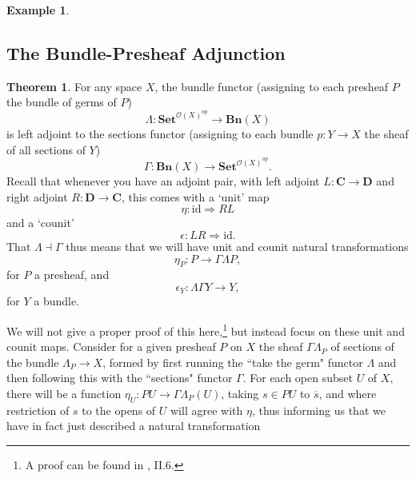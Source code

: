 \documentclass[11pt]{book}
\theoremstyle{definition}
\newtheorem{example}{Example}[section]
\theoremstyle{definition}
\theoremstyle{definition}
\newtheorem{theorem}{Theorem}[section]
\theoremstyle{theorem}
\theoremstyle{definition}
\begin{document}
\begin{example}
	\subsection{The Bundle-Presheaf Adjunction}
	\begin{theorem}
		For any space $X$, the bundle functor (assigning to each presheaf $P$ the bundle of germs of $P$)
		\begin{equation*}
		\Lambda: \textbf{Set}^{\mathscr{O}(X)^{op}} \rightarrow \textbf{Bn}(X)
		\end{equation*}
		is left adjoint to the sections functor (assigning to each bundle $p: Y \rightarrow X$ the sheaf of all sections of $Y$) 
		\begin{equation*}
		\Gamma: \textbf{Bn}(X) \rightarrow \textbf{Set}^{\mathscr{O}(X)^{op}}.
		\end{equation*}
		Recall that whenever you have an adjoint pair, with left adjoint $L: \textbf{C} \rightarrow \textbf{D}$ and right adjoint $R: \textbf{D} \rightarrow \textbf{C}$, this comes with a `unit' map 
		\begin{equation*}
		\eta: \text{id} \Rightarrow RL
		\end{equation*} 
		and a `counit' 
		\begin{equation*}
		\epsilon: LR \Rightarrow \text{id}.
		\end{equation*}
		That $\Lambda \dashv \Gamma$ thus means that we will have unit and counit natural transformations  
		\begin{equation*}
		\eta_P: P \rightarrow \Gamma \Lambda P, 
		\end{equation*}
		for $P$ a presheaf, 
		and 
		\begin{equation*}
		\epsilon_Y: \Lambda \Gamma Y \rightarrow Y,
		\end{equation*}
		for $Y$ a bundle. 
	\end{theorem}
We will not give a proper proof of this here,\footnote{A proof can be found in \cite{maclane_sheaves_1994}, II.6.} but instead focus on these unit and counit maps. Consider for a given presheaf $P$ on $X$ the sheaf $\Gamma \Lambda_P$ of sections of the bundle $\Lambda_P \rightarrow X$, formed by first running the ``take the germ" functor $\Lambda$ and then following this with the ``sections" functor $\Gamma$. For each open subset $U$ of $X$, there will be a function $\eta_U: PU \rightarrow \Gamma \Lambda_P (U)$, taking $s \in PU$ to $\overline{s}$, and where restriction of $s$ to the opens of $U$ will agree with $\eta$, thus informing us that we have in fact just described a natural transformation

\end{example}
\end{document}
